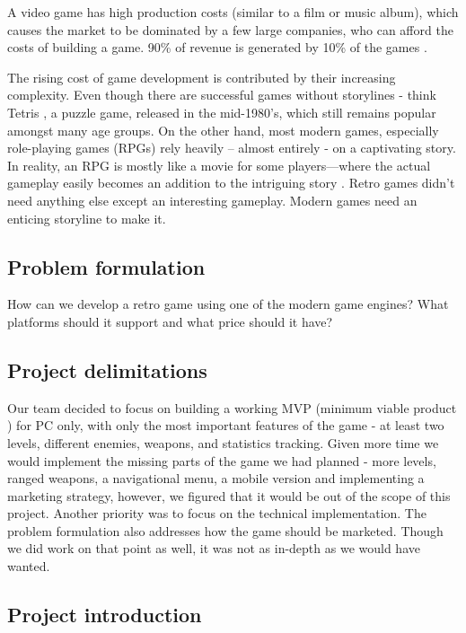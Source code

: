 \documentclass[12p]{article}
\begin{document}
A video game has high production costs (similar to a film or music album), which causes the market to be dominated by a few large companies, who can afford the costs of building a game. 90\% of revenue is generated by 10\% of the games \cite{UnderstandingVideoGames}.

The rising cost of game development is contributed by their increasing complexity. Even though there are successful games without storylines - think Tetris \cite{Tetris}, a puzzle game, released in the mid-1980’s, which still remains popular amongst many age groups. On the other hand, most modern games, especially role-playing games (RPGs) rely heavily – almost entirely - on a captivating story. In reality, an RPG is mostly like a movie for some players—where the actual gameplay easily becomes an addition to the intriguing story \cite{GameDevelopmentEssentials}. Retro games didn’t need anything else except an interesting gameplay. Modern games need an enticing storyline to make it.

\subsection{Problem formulation} \label{ProblemFormulation}

How can we develop a retro game using one of the modern game engines? What platforms should it support and what price should it have?

\subsection{Project delimitations} \label{ProjectDelimitations}

Our team decided to focus on building a working MVP (minimum viable product \cite{MVP}) for PC only, with only the most important features of the game - at least two levels, different enemies, weapons, and statistics tracking. Given more time we would implement the missing parts of the game we had planned - more levels, ranged weapons, a navigational menu, a mobile version and implementing a marketing strategy, however, we figured that it would be out of the scope of this project.
Another priority was to focus on the technical implementation. The problem formulation also addresses how the game should be marketed. Though we did work on that point as well, it was not as in-depth as we would have wanted. 

\subsection{Project introduction} \label{ProjectIntroduction}
\end{document}
